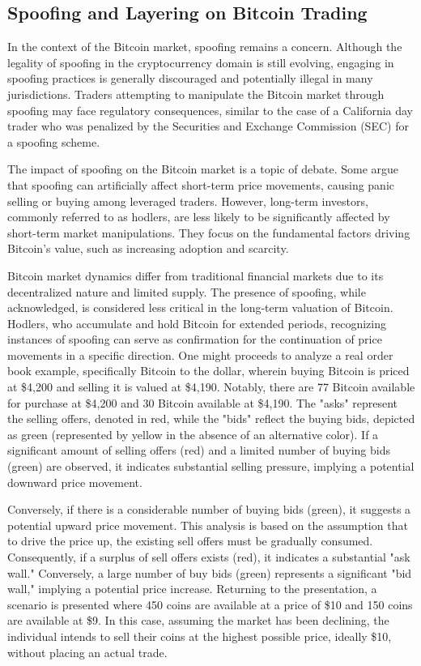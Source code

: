 \subsection{Spoofing and Layering on Bitcoin Trading}
In the context of the Bitcoin market, spoofing remains a concern. Although the legality of spoofing in the cryptocurrency
domain is still evolving, engaging in spoofing practices is generally discouraged and potentially illegal in many jurisdictions.
Traders attempting to manipulate the Bitcoin market through spoofing may face regulatory consequences, similar to the case
of a California day trader who was penalized by the Securities and Exchange Commission (SEC) for a spoofing scheme.

The impact of spoofing on the Bitcoin market is a topic of debate. Some argue that spoofing can artificially affect
short-term price movements, causing panic selling or buying among leveraged traders. However, long-term investors,
commonly referred to as hodlers, are less likely to be significantly affected by short-term market manipulations. They
focus on the fundamental factors driving Bitcoin's value, such as increasing adoption and scarcity.

Bitcoin market dynamics differ from traditional financial markets due to its decentralized nature and limited supply.
The presence of spoofing, while acknowledged, is considered less critical in the long-term valuation of Bitcoin. Hodlers,
who accumulate and hold Bitcoin for extended periods, recognizing instances of spoofing can serve as confirmation for the
continuation of price movements in a specific direction.
One might proceeds to analyze a real order book example, specifically Bitcoin to the dollar, wherein buying Bitcoin is priced
at \$4,200 and selling it is valued at \$4,190. Notably, there are 77 Bitcoin available for purchase at \$4,200 and 30
Bitcoin available at \$4,190. The "asks" represent the selling offers, denoted in red, while the "bids" reflect the buying
bids, depicted as green (represented by yellow in the absence of an alternative color). If a significant amount of selling
offers (red) and a limited number of buying bids (green) are observed, it indicates substantial selling pressure, implying
a potential downward price movement.

Conversely, if there is a considerable number of buying bids (green), it suggests a potential upward price movement. This
analysis is based on the assumption that to drive the price up, the existing sell offers must be gradually consumed.
Consequently, if a surplus of sell offers exists (red), it indicates a substantial "ask wall." Conversely, a large number
of buy bids (green) represents a significant "bid wall," implying a potential price increase. Returning to the presentation,
a scenario is presented where 450 coins are available at a price of \$10 and 150 coins are available at \$9. In this case,
assuming the market has been declining, the individual intends to sell their coins at the highest possible price, ideally
\$10, without placing an actual trade.


